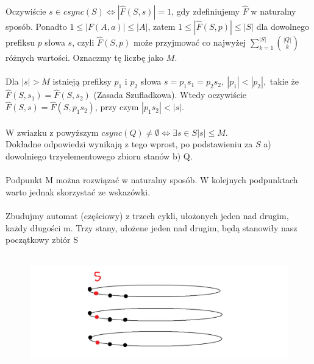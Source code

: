 \documentclass[a4paper,11pt]{article}
\newenvironment{zadanie}[1]
  {\renewcommand\theinnercustomthm{#1}\innercustomthm}
  {\endinnercustomthm}
\begin{document}
Oczywiście $s \in csync(S) \Longleftrightarrow |\widehat{F}(S,s)| = 1$, gdy zdefiniujemy $\widehat{F}$ w naturalny sposób. 
Ponadto $1 \leqslant |F(A,a)| \leqslant |A|$, zatem $1 \leqslant |\widehat{F}(S,p)| \leqslant |S|$ dla dowolnego prefiksu $p$ słowa $s$,
czyli $\widehat{F}(S,p)$ może przyjmować co najwyżej $\displaystyle{\sum\limits^{|S|}_{k=1}\binom{|Q|}{k}}$ różnych wartości.
Oznaczmy tę liczbę jako $M$. \\ \\

Dla $|s| > M$ istnieją prefiksy $p_1$ i $p_2$ słowa $s = p_1s_1 = p_2s_2, \ |p_1| < |p_2|,$ takie że 
$\widehat{F}(S,s_1) = \widehat{F}(S,s_2)$ (Zasada Szufladkowa). Wtedy oczywiście $\widehat{F}(S,s) = \widehat{F}(S,p_1s_2)$, przy czym 
$|p_1s_2| < |s|$. \\ \\
W zwiazku z powyższym $csync(Q) \neq \emptyset \Longleftrightarrow \exists s \in S |s| \leqslant M$. \\
Dokładne odpowiedzi wynikają z tego wprost, po podstawieniu za $S$ a) dowolniego trzyelementowego zbioru stanów b) Q. \\ \\

\begin{zadanie}{42}
\end{zadanie}
Podpunkt M można rozwiązać w naturalny sposób. W kolejnych podpunktach warto jednak skorzystać ze wskazówki. \\ \\

Zbudujmy automat (częściowy) z trzech cykli, ułożonych jeden nad drugim, każdy długości m. Trzy stany, ułożene jeden nad
drugim, będą stanowiły nasz początkowy zbiór S \\ \\

\begin{figure}[h!]
  \centerline{%
    \includegraphics[width=18cm]{zad42.png}%
  }%
\end{figure}
\end{document}
